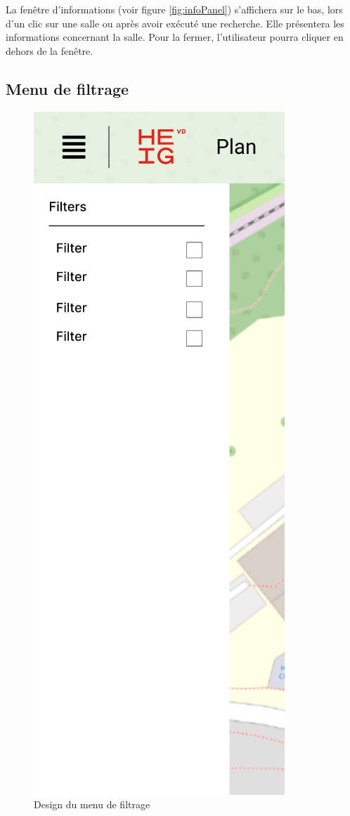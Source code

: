 \documentclass[
    iai, %
    il, %
]{heig-tb}
\begin{document}
La fenêtre d'informations (voir figure \ref{fig:infoPanel}) s'affichera sur le bas, lors d'un clic sur une salle ou après avoir exécuté une recherche.
Elle présentera les informations concernant la salle.
Pour la fermer, l'utilisateur pourra cliquer en dehors de la fenêtre.

\subsection{Menu de filtrage}

\begin{figure}[h]
    \centering
    \includegraphics[scale=0.5]{designFilter.png}
    \caption{Design du menu de filtrage}
    \label{fig:filterPanel}
\end{figure}
\end{document}
